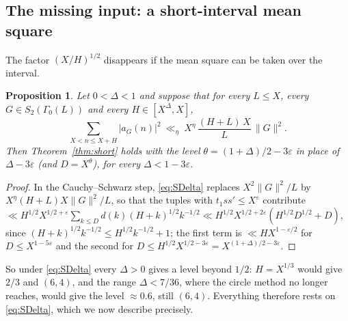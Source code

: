 \documentclass[11pt]{amsart}
\newtheorem{proposition}[theorem]{Proposition}
\theoremstyle{remark}
\newcommand{\e}{\varepsilon}
\begin{document}
\subsection{The missing input: a short-interval mean square}\label{subsec:missing}
The factor $(X/H)^{1/2}$ disappears if the mean square can be taken over the interval.

\begin{proposition}\label{prop:shortcond}
Let $0<\Delta<1$ and suppose that for every $L\le X$, every $G\in S_2(\Gamma_0(L))$ and every $H\in[X^\Delta,X]$,
\begin{equation}\label{eq:SDelta}
\sum_{X<n\le X+H}|a_G(n)|^2\ \ll_\eta\ X^{\eta}\,\frac{(H+L)\,X}{L}\,\|G\|^2 .
\end{equation}
Then Theorem~\ref{thm:short} holds with the level $\theta=(1+\Delta)/2-3\e$ in place of $\Delta-3\e$ (and $D=X^{\theta}$), for every $\Delta<1-3\e$.
\end{proposition}
\begin{proof}
In the Cauchy--Schwarz step, \eqref{eq:SDelta} replaces $X^2\|G\|^2/L$ by $X^{\eta}(H+L)X\|G\|^2/L$, so that the tuples with $t_1ss'\le X^\e$ contribute $\ll H^{1/2}X^{1/2+\e}\sum_{k\le D}d(k)(H+k)^{1/2}k^{-1/2}\ll H^{1/2}X^{1/2+2\e}(H^{1/2}D^{1/2}+D)$, since $(H+k)^{1/2}k^{-1/2}\le H^{1/2}k^{-1/2}+1$; the first term is $\ll HX^{1-\e/2}$ for $D\le X^{1-5\e}$ and the second for $D\le H^{1/2}X^{1/2-3\e}=X^{(1+\Delta)/2-3\e}$.
\end{proof}

So under \eqref{eq:SDelta} every $\Delta>0$ gives a level beyond $1/2$: $H=X^{1/3}$ would give $2/3$ and $(6,4)$, and the range $\Delta<7/36$, where the circle method no longer reaches, would give the level $\approx0.6$, still $(6,4)$. Everything therefore rests on \eqref{eq:SDelta}, which we now describe precisely.
\end{document}
